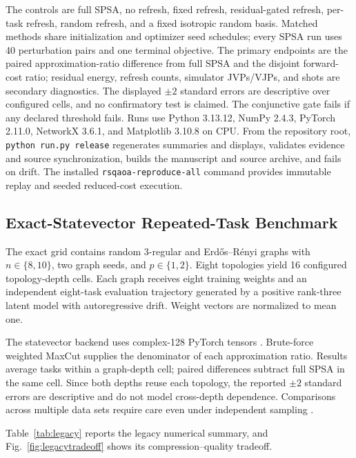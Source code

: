 \documentclass[aps,prx,reprint,superscriptaddress,floatfix]{revtex4-2}
\begin{document}
The controls are full SPSA, no refresh, fixed refresh, residual-gated refresh,
per-task refresh, random refresh, and a fixed isotropic random basis.  Matched
methods share initialization and optimizer seed schedules; every SPSA run uses
40 perturbation pairs and one terminal objective.  The primary endpoints are
the paired approximation-ratio difference from full SPSA and the disjoint
forward-cost ratio; residual energy, refresh counts, simulator JVPs/VJPs, and
shots are secondary diagnostics.  The displayed $\pm2$ standard errors are
descriptive over configured cells, and no confirmatory test is claimed.  The
conjunctive gate fails if any declared threshold fails.  Runs use Python
3.13.12, NumPy 2.4.3, PyTorch 2.11.0, NetworkX 3.6.1, and Matplotlib 3.10.8
on CPU.  From the repository root, \texttt{python run.py release} regenerates
summaries and displays, validates evidence and source synchronization, builds
the manuscript and source archive, and fails on drift.  The installed
\texttt{rsqaoa-reproduce-all} command provides immutable replay and seeded
reduced-cost execution.

\subsection{Exact-Statevector Repeated-Task Benchmark}

The exact grid contains random 3-regular and Erd\H{o}s--R\'enyi graphs with
$n\in\{8,10\}$, two graph seeds, and $p\in\{1,2\}$.  Eight topologies yield 16
configured topology-depth cells.  Each graph receives eight training weights
and an independent eight-task evaluation trajectory generated by a positive
rank-three latent model with autoregressive drift.  Weight vectors are
normalized to mean one.

The statevector backend uses complex-128 PyTorch tensors
\citep{paszke2019pytorch}.  Brute-force weighted MaxCut supplies the denominator
of each approximation ratio.  Results average tasks within a graph-depth cell;
paired differences subtract full SPSA in the same cell.  Since both depths
reuse each topology, the reported $\pm2$ standard errors are descriptive and
do not model cross-depth dependence.  Comparisons across multiple data sets
require care even under independent sampling \citep{demsar2006statistical}.

Table~\ref{tab:legacy} reports the legacy numerical summary, and
Fig.~\ref{fig:legacytradeoff} shows its compression--quality tradeoff.

\begin{table}[t]
\centering
\caption{\textbf{Legacy single-objective benchmark.}  Values are regenerated
from \texttt{experiments/results/maxcut\_small.csv}.  This track tests local
compression on independent objectives and is not merged with the repeated-task
development decision.}
\label{tab:legacy}
\resizebox{\textwidth}{!}{}
\end{table}
\end{document}
